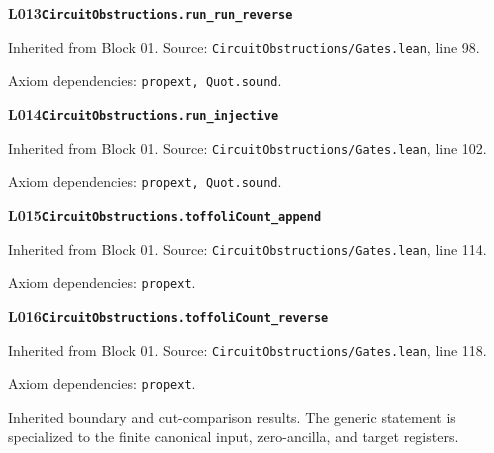 \begin{minipage}{\linewidth}
\hypertarget{L013}{}
{\small\sffamily\bfseries\color{ink}L013\quad\nolinkurl{CircuitObstructions.run_run_reverse}}\par
{\scriptsize\sffamily\color{muted}Inherited from Block 01. Source: \nolinkurl{CircuitObstructions/Gates.lean}, line 98.}\par
{}
{\scriptsize\sffamily\color{muted}Axiom dependencies: \nolinkurl{propext, Quot.sound}.}
\end{minipage}\par\medskip
\begin{minipage}{\linewidth}
\hypertarget{L014}{}
{\small\sffamily\bfseries\color{ink}L014\quad\nolinkurl{CircuitObstructions.run_injective}}\par
{\scriptsize\sffamily\color{muted}Inherited from Block 01. Source: \nolinkurl{CircuitObstructions/Gates.lean}, line 102.}\par
{}
{\scriptsize\sffamily\color{muted}Axiom dependencies: \nolinkurl{propext, Quot.sound}.}
\end{minipage}\par\medskip
\begin{minipage}{\linewidth}
\hypertarget{L015}{}
{\small\sffamily\bfseries\color{ink}L015\quad\nolinkurl{CircuitObstructions.toffoliCount_append}}\par
{\scriptsize\sffamily\color{muted}Inherited from Block 01. Source: \nolinkurl{CircuitObstructions/Gates.lean}, line 114.}\par
{}
{\scriptsize\sffamily\color{muted}Axiom dependencies: \nolinkurl{propext}.}
\end{minipage}\par\medskip
\begin{minipage}{\linewidth}
\hypertarget{L016}{}
{\small\sffamily\bfseries\color{ink}L016\quad\nolinkurl{CircuitObstructions.toffoliCount_reverse}}\par
{\scriptsize\sffamily\color{muted}Inherited from Block 01. Source: \nolinkurl{CircuitObstructions/Gates.lean}, line 118.}\par
{}
{\scriptsize\sffamily\color{muted}Axiom dependencies: \nolinkurl{propext}.}
\end{minipage}\par\medskip
{}
Inherited boundary and cut-comparison results. The generic statement is specialized to the finite canonical input, zero-ancilla, and target registers.
\par\medskip

